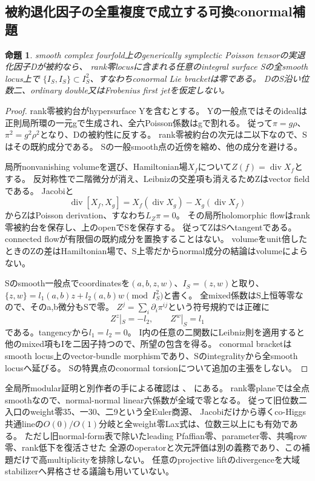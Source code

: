 \documentclass[a4paper,11pt]{ltjsarticle}
\newtheorem{proposition}{命題}[section]
\theoremstyle{definition}
\begin{document}
\subsection{被約退化因子の全重複度で成立する可換conormal補題}
\begin{proposition}\label{prop:reduced-zero-surface-abelian-conormal}
smooth complex fourfold上のgenerically symplectic Poisson tensorの実退化因子Dが被約なら、
rank零locusに含まれる任意のintegral surface Sの全smooth locus上で
$\{I_S,I_S\}\subset I_S^2$、すなわちconormal Lie bracketは零である。
DのS沿い位数二、ordinary double又はFrobenius first jetを仮定しない。
\end{proposition}
\begin{proof}
rank零被約台がhypersurface Yを含むとする。
Yの一般点ではそのidealは正則局所環の一元gで生成され、全六Poisson係数はgで割れる。
従って$\pi=g\rho$、$\pi^2=g^2\rho^2$となり、Dの被約性に反する。
rank零被約台の次元は二以下なので、Sはその既約成分である。
Sの一般smooth点の近傍を縮め、他の成分を避ける。

局所nonvanishing volumeを選び、Hamiltonian場$X_f$について$Z(f)=\operatorname{div}X_f$とする。
反対称性で二階微分が消え、Leibnizの交差項も消えるためZはvector fieldである。
Jacobiと
\[
 \operatorname{div}[X_f,X_g]
   =X_f(\operatorname{div}X_g)-X_g(\operatorname{div}X_f)
\]
からZはPoisson derivation、すなわち$L_Z\pi=0$。
その局所holomorphic flowはrank零被約台を保存し、上のopenでSを保存する。
従ってZはSへtangentである。connected flowが有限個の既約成分を置換することはない。
volumeをunit倍したときのZの差はHamiltonian場で、S上零だからnormal成分の結論はvolumeによらない。

Sのsmooth一般点でcoordinatesを$(a,b,z,w)$、$I_S=(z,w)$と取り、
$\{z,w\}=l_1(a,b)z+l_2(a,b)w\pmod {I_S^2}$と書く。
全mixed係数はS上恒等零なので、そのa,b微分もSで零。
$Z^j=\sum_i\partial_i\pi^{ij}$という符号規約では正確に
\[
 Z^z|_S=-l_2,\qquad Z^w|_S=l_1
\]
である。tangencyから$l_1=l_2=0$。
I内の任意の二関数にLeibniz則を適用すると他のmixed項もIを二因子持つので、所望の包含を得る。
conormal bracketはsmooth locus上のvector-bundle morphismであり、Sのintegralityから全smooth locusへ延びる。
Sの特異点のconormal torsionについて追加の主張をしない。
\end{proof}
全局所modular証明と別作者の手による確認は
、
にある。
rank零planeでは全点smoothなので、normal-normal linear六係数が全域で零となる。
従って旧位数二入口のweight零35、一30、二9という全Euler商源、
Jacobiだけから導くco-Higgs共通lineの$O(0)/O(1)$分岐と全weight零Lax式は、位数三以上にも有効である。
ただし旧normal-form表で除いたleading Pfaffian零、parameter零、共鳴row零、rank低下を復活させた
全源のoperatorと次元評価は別の義務であり、この補題だけで高multiplicityを排除しない。
任意のprojective liftのdivergenceを大域stabilizerへ昇格させる議論も用いていない。
\end{document}
